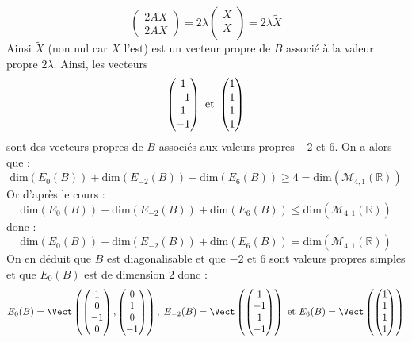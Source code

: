 \documentclass[a4paper,twoside,french,10pt]{VcCours}
\begin{document}
\begin{enumerate}
$$\begin{pmatrix}
2 AX \\
2AX
\end{pmatrix} = 2 \lambda \begin{pmatrix}
X \\
X \\
\end{pmatrix} = 2 \lambda \tilde{X}$$
Ainsi $\tilde{X}$ (non nul car $X$ l'est) est un vecteur propre de $B$ associé à la valeur propre $2 \lambda$. Ainsi, les vecteurs 
$$ \begin{pmatrix}
1 \\
-1 \\
1 \\
-1
\end{pmatrix} \hbox{ et } \begin{pmatrix}
1 \\
1 \\
1 \\
1 \\
\end{pmatrix}$$
sont des vecteurs propres de $B$ associés aux valeurs propres $-2$ et $6$. On a alors que :
$$ \textrm{dim}(E_0(B)) + \textrm{dim}(E_{-2}(B)) + \textrm{dim}(E_6(B))  \geq 4 = \textrm{dim}(\mathcal{M}_{4,1}(\mathbb{R}))$$
Or d'après le cours :
$$ \textrm{dim}(E_0(B)) + \textrm{dim}(E_{-2}(B)) + \textrm{dim}(E_6(B))  \leq \textrm{dim}(\mathcal{M}_{4,1}(\mathbb{R}))$$
donc :
$$ \textrm{dim}(E_0(B)) + \textrm{dim}(E_{-2}(B)) + \textrm{dim}(E_6(B))  = \textrm{dim}(\mathcal{M}_{4,1}(\mathbb{R}))$$
On en déduit que $B$ est diagonalisable et que $-2$ et $6$ sont valeurs propres simples et que $E_0(B)$ est de dimension $2$ donc :
$$ E_0(B) = \Vect \left(\begin{pmatrix}
1 \\
0 \\
-1 \\
0
\end{pmatrix},\begin{pmatrix}
0 \\
1 \\
0 \\
-1
\end{pmatrix}\right), \;  E_{-2}(B) = \Vect \left( \begin{pmatrix}
1 \\
-1 \\
1 \\
-1
\end{pmatrix}\right) \hbox{ et } E_{6}(B) = \Vect \left(\begin{pmatrix}
1 \\
1 \\
1 \\
1
\end{pmatrix}\right)$$
\end{enumerate}
\end{document}
